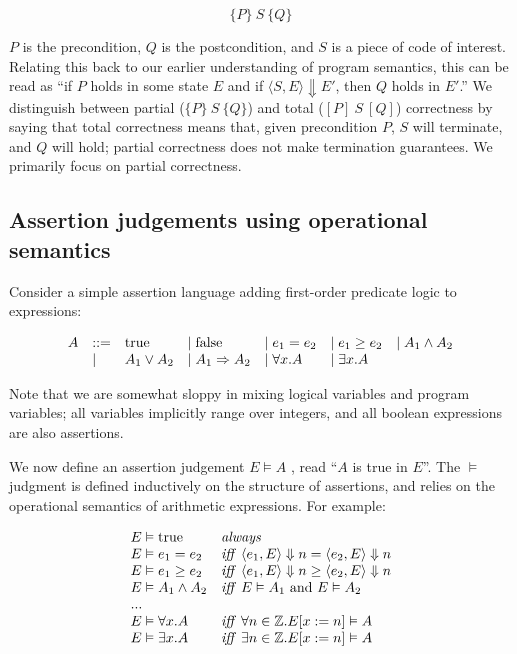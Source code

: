 \documentclass[11pt]{article}
\begin{document}
\[
\{P\} ~S~ \{Q\}
\]

$P$ is the precondition, $Q$ is the postcondition, and $S$ is a
piece of code of interest.  Relating this back to our earlier understanding of
program semantics, this can be read as ``if $P$ holds in some state $E$ and if
$\langle S, E \rangle \Downarrow E'$, then $Q$ holds in $E'$.''  We distinguish
between partial ($\{P\}~S~\{Q\}$) and total ($[P]~S~[Q]$) correctness by saying that total
correctness means that, given precondition $P$, $S$ will terminate, and $Q$
will hold; partial correctness does not make termination guarantees.  We primarily
focus on partial correctness.

\subsection{Assertion judgements using operational semantics}

Consider a simple assertion language adding first-order predicate logic to
\WhileLang expressions:

\[
\begin{array}{lllllll}
A & ::= & \mbox{true} & \mathrel{\mid} \mbox{false} & \mathrel{\mid} e_1 = e_2 & \mathrel{\mid} e_1 \ge e_2 & \mathrel{\mid} A_1 \wedge A_2 \\
  & \mathrel{\mid} & A_1 \vee A_2 & \mathrel{\mid} A_1 \Rightarrow A_2 & \mathrel{\mid} \forall x . A & \mathrel{\mid} \exists x . A
\end{array}
\]

Note that we are somewhat sloppy in mixing logical variables and program
variables; all \WhileLang variables implicitly range over integers, and all \WhileLang
boolean expressions are also assertions.

We now define an assertion judgement $E \vDash A$ , read ``$A$ is true in $E$''.
The $\vDash$ judgment is defined inductively on the structure of assertions, and
relies on the operational semantics of \WhileLang arithmetic expressions.  For
example:

\[
\begin{array}{ll}
E \vDash \mbox{true} & \mbox{\emph{always}} \\
E \vDash e_1 = e_2 & \mbox{\emph{iff}}~\langle e_1, E \rangle \Downarrow n = \langle e_2, E \rangle \Downarrow n \\
E \vDash e_1 \ge e_2 & \mbox{\emph{iff}}~ \langle e_1, E \rangle \Downarrow n \ge \langle e_2, E \rangle \Downarrow n \\
E \vDash A_1 \wedge A_2 & \mbox{\emph{iff}}~ E \vDash A_1 \text{~and~} E \vDash A_2 \\
... \\
E \vDash \forall x. A & \mbox{\emph{iff}}~ \forall n \in \mathbb{Z}  . E [x := n ] \vDash A \\
E \vDash \exists x. A &  \mbox{\emph{iff}}~ \exists n \in \mathbb{Z} . E[x:=n] \vDash A \\
\end{array}
\]
\end{document}
